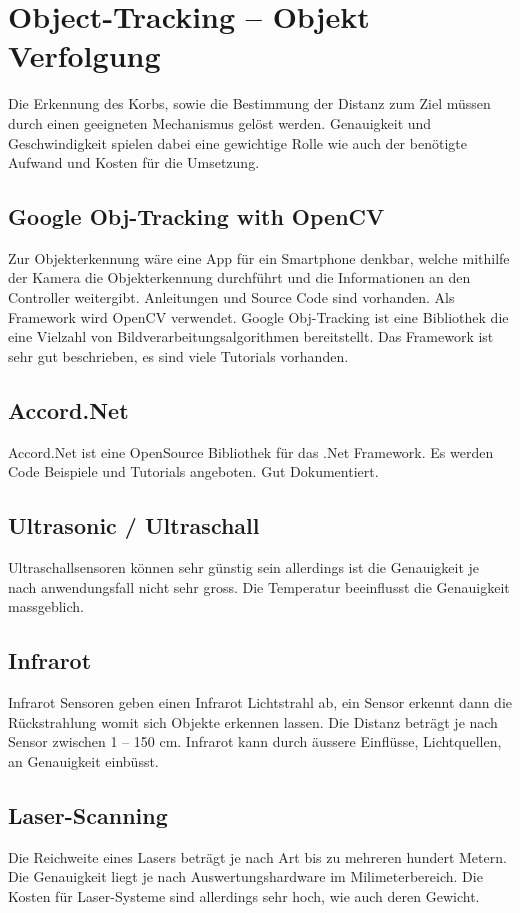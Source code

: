 ﻿\section{Object-Tracking – Objekt Verfolgung}
Die Erkennung des Korbs, sowie die Bestimmung der Distanz zum Ziel müssen durch einen geeigneten Mechanismus gelöst werden. Genauigkeit und Geschwindigkeit spielen dabei eine gewichtige Rolle wie auch der benötigte Aufwand und Kosten für die Umsetzung.

\subsection{Google Obj-Tracking with OpenCV}
Zur Objekterkennung wäre eine App für ein Smartphone denkbar, welche mithilfe der Kamera die Objekterkennung durchführt und die Informationen an den Controller weitergibt. Anleitungen und Source Code sind vorhanden. Als Framework wird OpenCV verwendet. Google Obj-Tracking ist eine Bibliothek die eine Vielzahl von Bildverarbeitungsalgorithmen bereitstellt. Das Framework ist sehr gut beschrieben, es sind viele Tutorials vorhanden.

\subsection{Accord.Net}
Accord.Net ist eine OpenSource Bibliothek für das .Net Framework. Es werden Code Beispiele und Tutorials angeboten. Gut Dokumentiert.

\subsection{Ultrasonic / Ultraschall }
Ultraschallsensoren können sehr günstig sein allerdings ist die Genauigkeit je nach anwendungsfall nicht sehr gross. Die Temperatur beeinflusst die Genauigkeit massgeblich. 

\subsection{Infrarot}
Infrarot Sensoren geben einen Infrarot Lichtstrahl ab, ein Sensor erkennt dann die Rückstrahlung womit sich Objekte erkennen lassen. Die Distanz beträgt je nach Sensor zwischen 1 – 150 cm. Infrarot kann durch äussere Einflüsse, Lichtquellen, an Genauigkeit einbüsst.

\subsection{Laser-Scanning}
Die Reichweite eines Lasers beträgt je nach Art bis zu mehreren hundert Metern. Die Genauigkeit liegt je nach Auswertungshardware im Milimeterbereich. Die Kosten für Laser-Systeme sind allerdings sehr hoch, wie auch deren Gewicht.

